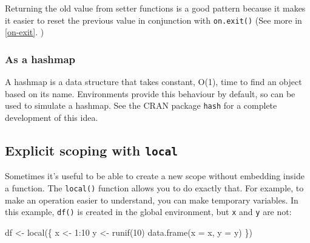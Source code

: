 \documentclass[oneside]{book}
\newenvironment{Shaded}{}{}
\newcommand{\KeywordTok} [1]{\textcolor[rgb]{0.00,0.44,0.13}{{#1}}}
\newcommand{\DataTypeTok}[1]{\textcolor[rgb]{0.56,0.13,0.00}{{#1}}}
\newcommand{\DecValTok}  [1]{\textcolor[rgb]{0.25,0.63,0.44}{{#1}}}
\newcommand{\StringTok}  [1]{\textcolor[rgb]{0.25,0.44,0.63}{{#1}}}
\newcommand{\NormalTok}  [1]{{#1}}
\renewcommand{\hyperref}[2][???]{\autoref{#1}}
\begin{document}
\begin{Shaded}
\end{Shaded}

Returning the old value from setter functions is a good pattern because
it makes it easier to reset the previous value in conjunction with
\texttt{on.exit()} (See more in \hyperref[on-exit]{on exit}. )

\subsubsection{As a hashmap}\label{as-a-hashmap}

A hashmap is a data structure that takes constant, O(1), time to find an
object based on its name. Environments provide this behaviour by
default, so can be used to simulate a hashmap. See the CRAN package
\texttt{hash} for a complete development of this idea.

\subsection{Explicit scoping with
\texttt{local}}\label{explicit-scoping-with-local}

Sometimes it's useful to be able to create a new scope without embedding
inside a function. The \texttt{local()} function allows you to do
exactly that. For example, to make an operation easier to understand,
you can make temporary variables. In this example, \texttt{df()} is
created in the global environment, but \texttt{x} and \texttt{y} are
not:

\begin{Shaded}
\begin{Highlighting}[]
\NormalTok{df <-}\StringTok{ }\KeywordTok{local}\NormalTok{(\{}
  \NormalTok{x <-}\StringTok{ }\DecValTok{1}\NormalTok{:}\DecValTok{10}
  \NormalTok{y <-}\StringTok{ }\KeywordTok{runif}\NormalTok{(}\DecValTok{10}\NormalTok{)}
  \KeywordTok{data.frame}\NormalTok{(}\DataTypeTok{x =} \NormalTok{x, }\DataTypeTok{y =} \NormalTok{y)}
\NormalTok{\})}
\end{Highlighting}
\end{Shaded}
\end{document}
